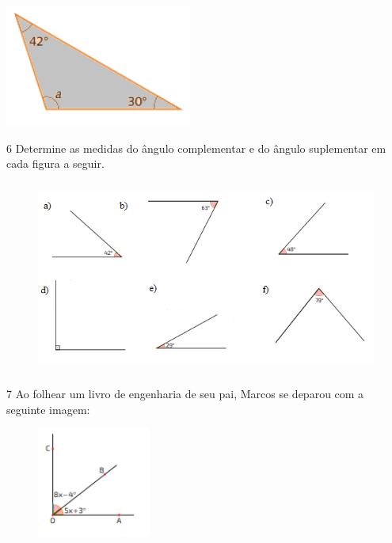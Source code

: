 \begin{multicols}{2}
\begin{escolha}
\item \includegraphics[height=4cm]{./imgSAEB_8_MAT/media/image29.png}
\end{escolha}
\end{multicols}



\num{6} Determine as medidas do ângulo complementar e do ângulo suplementar
em cada figura a seguir.

\begin{figure}[H]
\centering\includegraphics[width=4.81667in,height=2.48373in]{./imgSAEB_8_MAT/media/image30.png}
\end{figure}


\num{7} Ao folhear um livro de engenharia de seu pai, Marcos se deparou com a
seguinte imagem:

\begin{figure}[H]
\centering\includegraphics[width=1.47134in,height=1.42708in]{./imgSAEB_8_MAT/media/image31.png}
\end{figure}

